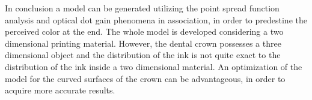 In conclusion a model can be generated utilizing the point spread function analysis and optical dot gain phenomena in association, in order to predestine the perceived color at the end. The whole model is developed considering a two dimensional printing material. However, the dental crown possesses a three dimensional object and the distribution of the ink is not quite exact to the distribution of the ink inside a two dimensional material. An optimization of the model for the curved surfaces of the crown can be advantageous, in order to acquire more accurate results.

